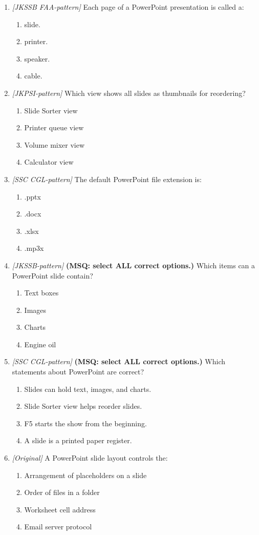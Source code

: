 \begin{enumerate}[label=\textbf{Q\arabic*.}, leftmargin=*]
\item \textit{[JKSSB FAA-pattern]} Each page of a PowerPoint presentation is called a:
  \begin{enumerate}[label=\Alph*.]
    \item slide.
    \item printer.
    \item speaker.
    \item cable.
  \end{enumerate}
\item \textit{[JKPSI-pattern]} Which view shows all slides as thumbnails for reordering?
  \begin{enumerate}[label=\Alph*.]
    \item Slide Sorter view
    \item Printer queue view
    \item Volume mixer view
    \item Calculator view
  \end{enumerate}
\item \textit{[SSC CGL-pattern]} The default PowerPoint file extension is:
  \begin{enumerate}[label=\Alph*.]
    \item .pptx
    \item .docx
    \item .xlsx
    \item .mp3x
  \end{enumerate}
\item \textit{[JKSSB-pattern]} \textbf{(MSQ: select ALL correct options.)} Which items can a PowerPoint slide contain?
  \begin{enumerate}[label=\Alph*.]
    \item Text boxes
    \item Images
    \item Charts
    \item Engine oil
  \end{enumerate}
\item \textit{[SSC CGL-pattern]} \textbf{(MSQ: select ALL correct options.)} Which statements about PowerPoint are correct?
  \begin{enumerate}[label=\Alph*.]
    \item Slides can hold text, images, and charts.
    \item Slide Sorter view helps reorder slides.
    \item F5 starts the show from the beginning.
    \item A slide is a printed paper register.
  \end{enumerate}
\item \textit{[Original]} A PowerPoint slide layout controls the:
  \begin{enumerate}[label=\Alph*.]
\item Arrangement of placeholders on a slide
   \item Order of files in a folder
   \item Worksheet cell address
   \item Email server protocol
  \end{enumerate}


\end{enumerate}
